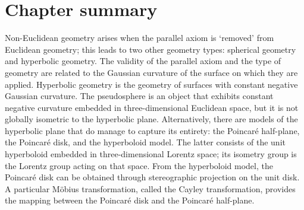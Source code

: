\section*{Chapter summary}
Non-Euclidean geometry arises when the parallel axiom is `removed' from Euclidean geometry; this leads to two other geometry types: spherical geometry and hyperbolic geometry. The validity of the parallel axiom and the type of geometry  are related to the Gaussian curvature of the surface on which they are applied. Hyperbolic geometry is the geometry of surfaces with constant negative Gaussian curvature. The pseudosphere is an object that exhibits constant negative curvature embedded in three-dimensional Euclidean space, but it is not globally isometric to the hyperbolic plane. Alternatively, there are models of the hyperbolic plane that do manage to capture its entirety: the Poincaré half-plane, the Poincaré disk, and the hyperboloid model. The latter consists of the unit hyperboloid embedded in three-dimensional Lorentz space; its isometry group is the Lorentz group acting on that space. From the hyperboloid model, the Poincaré disk can be obtained through stereographic projection on the unit disk. A particular Möbius transformation, called the Cayley transformation, provides the mapping between the Poincaré disk and the Poincaré half-plane.
